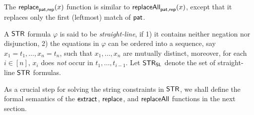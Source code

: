 The $\mathsf{replace}_{\mathsf{pat}, \mathsf{rep}}(x)$ function is similar to $\mathsf{replaceAll}_{\mathsf{pat}, \mathsf{rep}}(x)$, except that it replaces only the first (leftmost) match of $\mathsf{pat}$.

A $\mathsf{STR}$ formula $\varphi$ is said to be \emph{straight-line}, if 1) it contains neither negation nor disjunction, 2) the equations in $\varphi$ can be ordered into a sequence, say $x_1 = t_1, \ldots, x_n = t_n$, such that $x_1,\ldots, x_n$ are mutually distinct, moreover, for each $i \in [n]$, $x_i$ does \emph{not} occur in $t_1, \ldots, t_{i-1}$. Let $\mathsf{STR}_{\mathsf{SL}}$ denote the set of straight-line $\mathsf{STR}$ formulas.

As a crucial step for solving the string constraints in $\mathsf{STR}$, we shall define the formal semantics of the $\mathsf{extract}$, $\mathsf{replace}$, and $\mathsf{replaceAll}$ functions in the next section.

%
%
%
%
%
%
